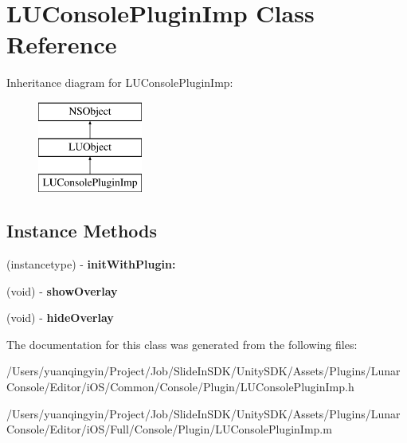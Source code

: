 \hypertarget{interface_l_u_console_plugin_imp}{}\section{L\+U\+Console\+Plugin\+Imp Class Reference}
\label{interface_l_u_console_plugin_imp}
Inheritance diagram for L\+U\+Console\+Plugin\+Imp\+:\begin{figure}[H]
\begin{center}
\leavevmode
\includegraphics[height=3.000000cm]{interface_l_u_console_plugin_imp}
\end{center}
\end{figure}
\subsection*{Instance Methods}
\begin{DoxyCompactItemize}
\item 
\mbox{\label{interface_l_u_console_plugin_imp_ae77f5a923dd17e2d23894758ad6f303a}} 
(instancetype) -\/ {\bfseries init\+With\+Plugin\+:}
\item 
\mbox{\label{interface_l_u_console_plugin_imp_a407072eeca53bb01a6c53aad72bacc00}} 
(void) -\/ {\bfseries show\+Overlay}
\item 
\mbox{\label{interface_l_u_console_plugin_imp_ade03d36d1ff579cb688282bbbf4e588a}} 
(void) -\/ {\bfseries hide\+Overlay}
\end{DoxyCompactItemize}


The documentation for this class was generated from the following files\+:\begin{DoxyCompactItemize}
\item 
/\+Users/yuanqingyin/\+Project/\+Job/\+Slide\+In\+S\+D\+K/\+Unity\+S\+D\+K/\+Assets/\+Plugins/\+Lunar\+Console/\+Editor/i\+O\+S/\+Common/\+Console/\+Plugin/L\+U\+Console\+Plugin\+Imp.\+h\item 
/\+Users/yuanqingyin/\+Project/\+Job/\+Slide\+In\+S\+D\+K/\+Unity\+S\+D\+K/\+Assets/\+Plugins/\+Lunar\+Console/\+Editor/i\+O\+S/\+Full/\+Console/\+Plugin/L\+U\+Console\+Plugin\+Imp.\+m\end{DoxyCompactItemize}

